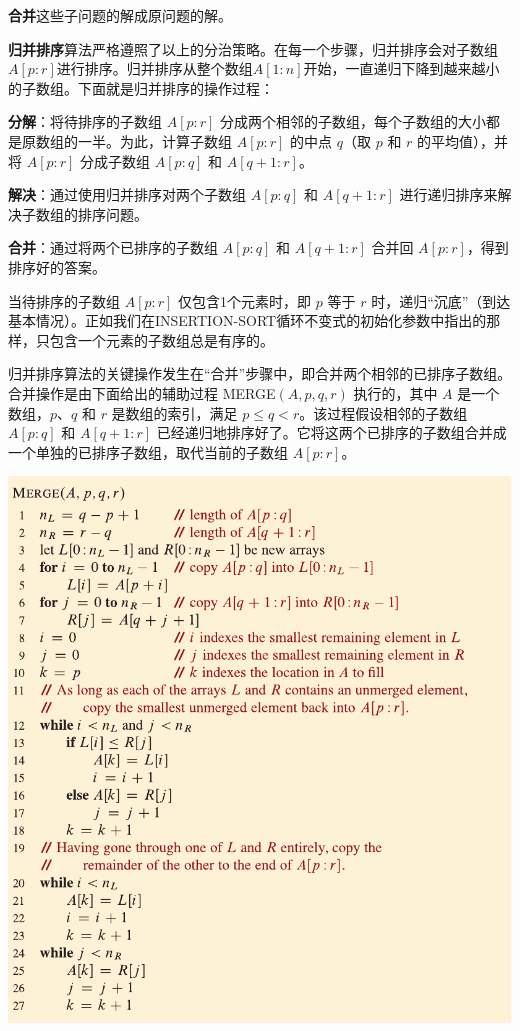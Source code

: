 \documentclass[lang=cn,newtx,10pt,scheme=chinese]{elegantbook}
\begin{document}
\textbf{合并}这些子问题的解成原问题的解。

\textbf{归并排序}算法严格遵照了以上的分治策略。在每一个步骤，归并排序会对子数组$A[p:r]$进行排序。归并排序从整个数组$A[1:n]$开始，一直递归下降到越来越小的子数组。下面就是归并排序的操作过程：

\textbf{分解}：将待排序的子数组 $A[p:r]$ 分成两个相邻的子数组，每个子数组的大小都是原数组的一半。为此，计算子数组 $A[p:r]$ 的中点 $q$（取 $p$ 和 $r$ 的平均值），并将 $A[p:r]$ 分成子数组 $A[p:q]$ 和 $A[q+1:r]$。

\textbf{解决}：通过使用归并排序对两个子数组 $A[p:q]$ 和 $A[q+1:r]$ 进行递归排序来解决子数组的排序问题。

\textbf{合并}：通过将两个已排序的子数组 $A[p:q]$ 和 $A[q+1:r]$ 合并回 $A[p:r]$，得到排序好的答案。

当待排序的子数组 $A[p:r]$ 仅包含1个元素时，即 $p$ 等于 $r$ 时，递归``沉底''（到达基本情况）。正如我们在INSERTION-SORT循环不变式的初始化参数中指出的那样，只包含一个元素的子数组总是有序的。

归并排序算法的关键操作发生在``合并''步骤中，即合并两个相邻的已排序子数组。合并操作是由下面给出的辅助过程 MERGE$(A,p,q,r)$ 执行的，其中 $A$ 是一个数组，$p$、$q$ 和 $r$ 是数组的索引，满足 $p\le q < r$。该过程假设相邻的子数组 $A[p:q]$ 和 $A[q+1:r]$ 已经递归地排序好了。它将这两个已排序的子数组合并成一个单独的已排序子数组，取代当前的子数组 $A[p:r]$。

\includegraphics{算法导论第四版插图/第二章/归并过程伪代码.pdf}
\end{document}

